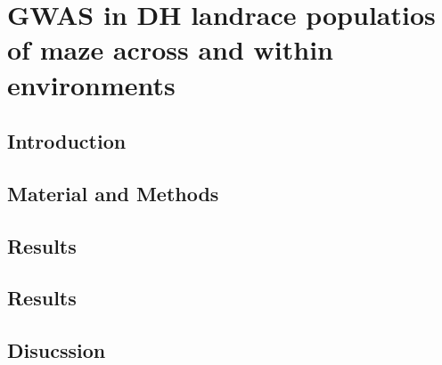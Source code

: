 \section{GWAS in DH landrace populatios of maze across and within environments }

\subsection{Introduction}
\subsection{Material and Methods}
\subsection{Results}
\subsection{Results}
\subsection{Disucssion}

